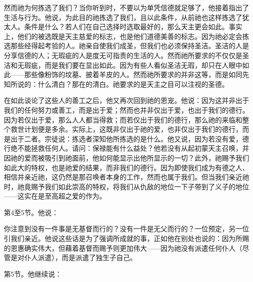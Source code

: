 然而祂为何拣选了我们？当你听到时，不要以为单凭信德就足够了，他接着指出了生活与行为。他说，为此目的祂拣选了我们，且以此条件，从前祂也这样拣选了犹太人。条件是什么？若人们在自己选择时选取最好的，那么天主更会如此。事实上，他们的被选既是天主慈爱的标志，也是他们道德美善的标志。因为祂必定会拣选那些经得起考验的人。祂亲自使我们成圣，但我们也必须保持圣洁。圣洁的人是分享信德的人；无瑕疵的人是度无可指责的生活的人。然而祂所要求的不仅仅是圣洁和无瑕疵，而是我们要在显出如此。因为有些人看似圣洁无瑕，却只在人眼中如此——那些像粉饰的坟墓、披着羊皮的人。然而祂所要求的并非这等，而是如同先知所说的：什么清白？那在的清白。祂要求的是天主之目可以注视的圣德。\par

在如此谈论了这些人的善工之后，他又再次回到祂的恩宠。他说：因为这并非出于我们的任何努力或善工，而是出于爱；然而也并非仅出于爱，也出于我们的德行。因为若仅出于爱，那么人人都当得救；而若仅出于我们的德行，那么祂的来临和整个救世计划便是多余。实际上，这既非仅出于祂的爱，也非仅出于我们的德行，而是出于二者。宗徒说：拣选者深知他所拣选的是什么。他又说，因为若没有爱，德行绝不能拯救任何人。请问：保禄能有什么益处？他若没有从起初蒙天主召唤，并因祂的爱而被吸引到祂面前，他如何能显示出他所显示的一切？此外，祂赐予我们如此大的特权，也是祂爱的结果，而非我们的德行。因为即使我们成为有德之人、相信并亲近祂，这仍然是那召唤者本身的工作，然而也属于我们。但当我们亲近祂时，祂竟赐予我们如此崇高的特权，将我们从仇敌的地位一下子带到了义子的地位——这实在是至高超之爱的作为。\par

第4至5节。他说：\par

你注意到没有一件事是无基督而行的？没有一件是无父而行的？一位预定，另一位引我们亲近。他说这些话是为了强调所成就的事，正如他在别处也说的：因为所赐的恩惠确实伟大，但藉着基督而赐予则更加伟大——因为祂没有派遣任何仆人（尽管是对仆人派遣），而是派遣了独生子自己。\par

第5节。他继续说：\par

